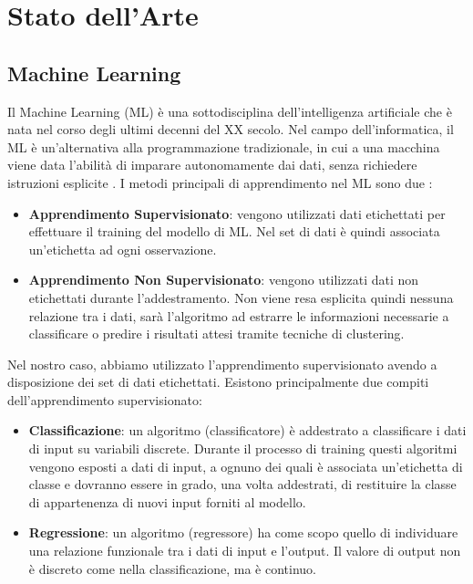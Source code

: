 \chapter{Stato dell'Arte}

\medskip

\section{Machine Learning}

Il Machine Learning (ML) \`e una sottodisciplina dell'intelligenza artificiale che \`e nata nel corso degli ultimi decenni del XX secolo. Nel campo dell'informatica, il ML \`e un'alternativa alla programmazione tradizionale, in cui a una macchina viene data l'abilit\`a di imparare autonomamente dai dati, senza richiedere istruzioni esplicite \cite{book_ML}. 
I metodi principali di apprendimento nel ML sono due \cite{ML_sup_unsup}:

\begin{itemize}

  \item \textbf{Apprendimento Supervisionato}: vengono utilizzati dati etichettati per effettuare il training del modello di ML. Nel set di dati \`e quindi associata un'etichetta ad ogni osservazione.
  
  \item \textbf{Apprendimento Non Supervisionato}: vengono utilizzati dati non etichettati durante l'addestramento. Non viene resa esplicita quindi nessuna relazione tra i dati, sar\`a l'algoritmo ad estrarre le informazioni necessarie a classificare o predire i risultati attesi tramite tecniche di clustering.
    
\end{itemize}

Nel nostro caso, abbiamo utilizzato l'apprendimento supervisionato avendo a disposizione dei set di dati etichettati.
Esistono principalmente due compiti dell'apprendimento supervisionato\cite{wiki_ML}:
\begin{itemize}

  \item \textbf{Classificazione}: un algoritmo (classificatore) \`e addestrato a classificare i dati di input su variabili discrete. Durante il processo di training questi algoritmi vengono esposti a dati di input, a ognuno dei quali \`e associata un'etichetta di classe e dovranno essere in grado, una volta addestrati, di restituire la classe di appartenenza di nuovi input forniti al modello.
  
  \item \textbf{Regressione}: un algoritmo (regressore) ha come scopo quello di individuare una relazione funzionale tra i dati di input e l'output. Il valore di output non \`e discreto come nella classificazione, ma \`e continuo.
    
\end{itemize}



